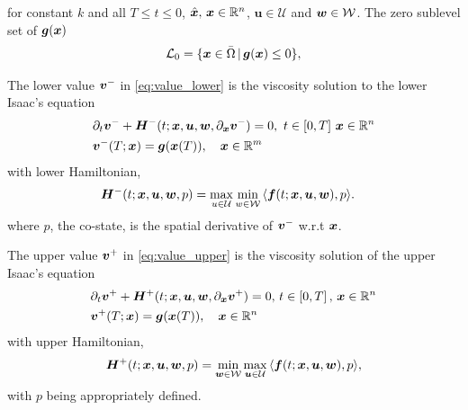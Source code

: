for constant $k$ and all 
$T \le t \le 0$, $\hat{\bm{x}}, \, \bm{x} \in \mathbb{R}^n$, $\bm{u}\in \mathcal{U}$ and $\bm{w} \in \mathcal{W}$.  The zero sublevel set of $\bm{g}(\bm{x})$ \ie
%
\begin{align}
	\mathcal{L}_0 = \{ \bm{x} \in \bar{\Omega} \,|\, \bm{g}(\bm{x}) \le 0 \},
	\label{eq:target_set_syk}
\end{align}

%
\begin{lemma}
	The lower value $\bm{v}^-$ in \eqref{eq:value_lower} is the viscosity solution to the lower Isaac's equation 
	\begin{subequations}
		\begin{align}
			&{\partial_t \bm{v}^-}+ \bm{H}^- (t; \bm{x}, \bm{u}, \bm{w}, \partial_{\bm{x}}\bm{v}^-) = 0, \,\, t\in \left[0, T\right]\, \bm{x} \in \mathbb{R}^n  \\
			&\bm{v}^-(T; \bm{x}) = \bm{g}(\bm{x}(T)), \quad \bm{x} \in \mathbb{R}^m
			\label{eq:lower_visc_boundary}
		\end{align}
		\label{eq:lower_visc}
	\end{subequations}
	with lower Hamiltonian, 
	\begin{align}
		&\bm{H}^- (t; \bm{x}, \bm{u}, \bm{w}, p) = \max_{u \in \mathcal{U}} \min_{w \in \mathcal{W}} \, \langle \bm{f}(t; \bm{x}, \bm{u}, \bm{w}), p  \rangle.
	\end{align}
%
where $p$, the co-state, is the spatial derivative of $\bm{v}^-$ w.r.t $\bm{x}$.
	\label{lemma:lower_visc_lemma}
\end{lemma}
%
\begin{lemma}
	The upper value $\bm{v}^+$ in \eqref{eq:value_upper} is the viscosity solution of the upper Isaac's equation 
	\begin{subequations}
		\begin{align}
			&\partial_t{\bm{v}^+} + \bm{H}^+ (t; \bm{x}, \bm{u}, \bm{w},  \partial_{\bm{x}}\bm{v}^+)= 0, \, t\in \left[0,T\right],\, \bm{x} \in \mathbb{R}^n
			 \\
			&\bm{v}^+(T; \bm{x}) = \bm{g}(\bm{x}(T)), \quad \bm{x} \in \mathbb{R}^n
		\end{align}
		\label{eq:upper_visc}
	\end{subequations}
	with upper Hamiltonian, 
	\begin{align}
		\bm{H}^+ (t; \bm{x}, \bm{u}, \bm{w}, p) = \min_{\bm{w} \in \mathcal{W}} \max_{\bm{u} \in \mathcal{U}} \, \langle \bm{f}(t; \bm{x}, \bm{u}, \bm{w}), p \rangle,
	\end{align}
	with $p$ being appropriately defined.
	\label{lemma:upper_visc_lemma}
\end{lemma}
